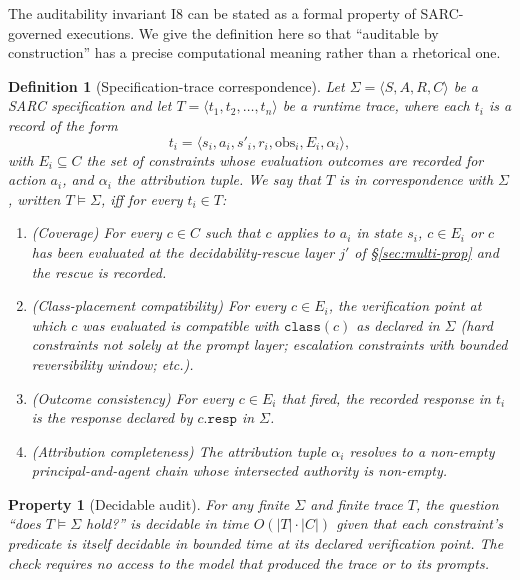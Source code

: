 \documentclass[11pt,a4paper]{article}
\newtheorem{definition}{Definition}
\newtheorem{property}{Property}
\theoremstyle{remark}
\begin{document}
The auditability invariant I8 can be stated as a formal property of SARC-governed executions. We give the definition here so that ``auditable by construction'' has a precise computational meaning rather than a rhetorical one.

\begin{definition}[Specification-trace correspondence]\label{def:stc}
Let $\Sigma = \langle S, A, R, C \rangle$ be a SARC specification and let $T = \langle t_1, t_2, \ldots, t_n \rangle$ be a runtime trace, where each $t_i$ is a record of the form
\[
    t_i = \langle s_i, a_i, s'_i, r_i, \text{obs}_i, E_i, \alpha_i \rangle,
\]
with $E_i \subseteq C$ the set of constraints whose evaluation outcomes are recorded for action $a_i$, and $\alpha_i$ the attribution tuple. We say that $T$ is in correspondence with $\Sigma$, written $T \models \Sigma$, iff for every $t_i \in T$:
\begin{enumerate}[leftmargin=2em,topsep=0.2em,itemsep=0.2em]
\item \emph{(Coverage)} For every $c \in C$ such that $c$ applies to $a_i$ in state $s_i$, $c \in E_i$ or $c$ has been evaluated at the decidability-rescue layer $j'$ of \S\ref{sec:multi-prop} and the rescue is recorded.
\item \emph{(Class-placement compatibility)} For every $c \in E_i$, the verification point at which $c$ was evaluated is compatible with $\texttt{class}(c)$ as declared in $\Sigma$ (hard constraints not solely at the prompt layer; escalation constraints with bounded reversibility window; etc.).
\item \emph{(Outcome consistency)} For every $c \in E_i$ that fired, the recorded response in $t_i$ is the response declared by $c.\texttt{resp}$ in $\Sigma$.
\item \emph{(Attribution completeness)} The attribution tuple $\alpha_i$ resolves to a non-empty principal-and-agent chain whose intersected authority is non-empty.
\end{enumerate}
\end{definition}

\begin{property}[Decidable audit]\label{prop:decidable-audit}
For any finite $\Sigma$ and finite trace $T$, the question ``does $T \models \Sigma$ hold?'' is decidable in time $O(|T| \cdot |C|)$ given that each constraint's predicate is itself decidable in bounded time at its declared verification point. The check requires no access to the model that produced the trace or to its prompts.
\end{property}
\end{document}
